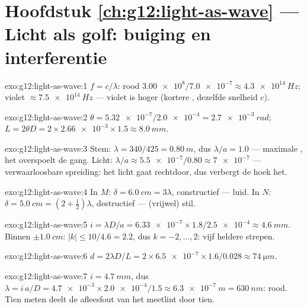 \section*{Hoofdstuk \ref{ch:g12:light-as-wave} --- Licht als golf: buiging en interferentie}

\begin{solution}{exo:g12:light-as-wave:1}
$f = c/\lambda$: rood $\num{3.00e8}/\num{7.0e-7} \approx
\qty{4.3e14}{Hz}$; violet $\approx \qty{7.5e14}{Hz}$ --- violet is hoger
(kortere , dezelfde snelheid $c$).
\end{solution}

\begin{solution}{exo:g12:light-as-wave:2}
$\theta = \num{5.32e-7}/\num{2.0e-4} = \qty{2.7e-3}{rad}$;
$L = 2\theta D = 2 \times \num{2.66e-3} \times 1.5 \approx \qty{8.0}{mm}$.
\end{solution}

\begin{solution}{exo:g12:light-as-wave:3}
Stem: $\lambda = 340/425 = \qty{0.80}{m}$, dus $\lambda/a = 1.0$ ---
maximale , het  overspoelt de gang. Licht:
$\lambda/a \approx \num{5.5e-7}/0.80 \approx \num{7e-7}$ ---
verwaarloosbare spreiding: het licht gaat rechtdoor, dus verbergt de hoek
het.
\end{solution}

\begin{solution}{exo:g12:light-as-wave:4}
In $M$: $\delta = \qty{6.0}{cm} = 3\lambda$, constructief --- luid. In
$N$: $\delta = \qty{5.0}{cm} = (2 + \tfrac12)\lambda$, destructief ---
(vrijwel) stil.
\end{solution}

\begin{solution}{exo:g12:light-as-wave:5}
$i = \lambda D/a = \num{6.33e-7} \times 1.8/\num{2.5e-4} \approx
\qty{4.6}{mm}$. Binnen $\pm\qty{1.0}{cm}$: $|k| \leq 10/4.6 = 2.2$, dus
$k = -2, \dots, 2$: vijf heldere strepen.
\end{solution}

\begin{solution}{exo:g12:light-as-wave:6}
$d = 2\lambda D/L = 2 \times \num{6.5e-7} \times 1.6/0.028 \approx
\qty{74}{\micro m}$.
\end{solution}

\begin{solution}{exo:g12:light-as-wave:7}
$i = \qty{4.7}{mm}$, dus $\lambda = i\,a/D = \num{4.7e-3} \times
\num{2.0e-4}/1.5 \approx \qty{6.3e-7}{m} = \qty{630}{nm}$: rood. Tien
 meten deelt de afleesfout van het meetlint door tien.
\end{solution}

